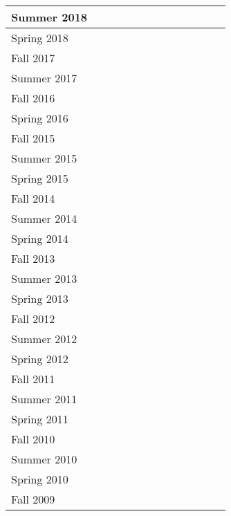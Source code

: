 \documentclass[11pt]{letter}
\newcommand{\ck}{\checkmark}
\begin{document}
\begin{tabular}{|l|c|c|c|c|c|c|c|c|c|c|c|c|}
  Summer 2018 &    &    &    &    &    &\ck &    &    &    &    &    &    \\ \hline
  Spring 2018 &    &    &    &    &    &\ck &    &    &    &\ck &    &    \\ \hline
  Fall   2017 &    &    &    &    &\ck &\ck &    &    &    &    &    &    \\ \hline
  Summer 2017 &    &    &    &    &    &    &    &\ck &    &    &    &    \\ \hline
  Fall   2016 &    &\ck &    &    &    &    &\ck &    &    &    &    &    \\ \hline
  Spring 2016 &    &\ck &    &    &    &    &    &    &    &\ck &    &    \\ \hline
  Fall   2015 &    &\ck &    &    &    &    &\ck &    &    &    &    &    \\ \hline
  Summer 2015 &    &    &    &    &    &\ck &    &    &    &    &    &    \\ \hline
  Spring 2015 &    &    &\ck &    &    &\ck &    &    &    &    &    &    \\ \hline
  Fall   2014 &    &    &    &    &    &\ck &\ck &    &    &    &    &    \\ \hline
  Summer 2014 &    &    &    &    &    &\ck &    &    &    &    &    &    \\ \hline
  Spring 2014 &    &    &    &    &    &\ck &    &    &    &    &    &    \\ \hline
  Fall   2013 &    &\ck &    &    &    &    &    &    &\ck &    &    &    \\ \hline
  Summer 2013 &    &    &    &    &    &\ck &    &    &    &    &    &    \\ \hline
  Spring 2013 &    &\ck &    &    &    &\ck &    &    &    &    &    &    \\ \hline
  Fall   2012 &\ck &    &    &    &    &    &    &    &    &    &    &    \\ \hline
  Summer 2012 &    &    &    &    &    &\ck &    &\ck &    &    &    &    \\ \hline
  Spring 2012 &\ck &    &    &    &    &\ck &\ck &    &    &    &    &    \\ \hline
  Fall   2011 &\ck &    &    &    &    &    &    &    &    &    &    &\ck \\ \hline
  Summer 2011 &    &    &    &    &    &\ck &    &    &    &    &    &    \\ \hline
  Spring 2011 &\ck &    &    &\ck &    &\ck &    &    &    &    &    &    \\ \hline
  Fall   2010 &\ck &    &    &    &    &    &    &    &    &    &    &    \\ \hline
  Summer 2010 &    &    &    &    &    &\ck &    &    &    &    &    &    \\ \hline
  Spring 2010 &\ck &    &    &\ck &    &\ck &    &    &    &    &    &    \\ \hline
  Fall   2009 &\ck &    &    &    &    &\ck &    &    &    &    &    &    \\ \hline
\end{tabular}
\end{document}
